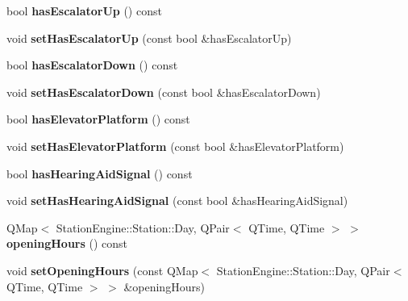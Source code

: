 \begin{DoxyCompactItemize}
bool {\bfseries has\+Escalator\+Up} () const
\item 
\mbox{\label{classStationEngine_1_1Station_abcd22776685752bf1f2a3cfa0f84bcc0}} 
void {\bfseries set\+Has\+Escalator\+Up} (const bool \&has\+Escalator\+Up)
\item 
\mbox{\label{classStationEngine_1_1Station_abc49d1258d3dd4b7b3915c37eec8ce8b}} 
bool {\bfseries has\+Escalator\+Down} () const
\item 
\mbox{\label{classStationEngine_1_1Station_a13d18cc2d7b1ceb4e855c686780f5fe4}} 
void {\bfseries set\+Has\+Escalator\+Down} (const bool \&has\+Escalator\+Down)
\item 
\mbox{\label{classStationEngine_1_1Station_ad942fab0cd4c1bd8bac2858b767cbd8d}} 
bool {\bfseries has\+Elevator\+Platform} () const
\item 
\mbox{\label{classStationEngine_1_1Station_a0b35cc4aa9f9ae7dc9503c7ea0919cb1}} 
void {\bfseries set\+Has\+Elevator\+Platform} (const bool \&has\+Elevator\+Platform)
\item 
\mbox{\label{classStationEngine_1_1Station_a971f2d09863474606867de1bffc5e0f8}} 
bool {\bfseries has\+Hearing\+Aid\+Signal} () const
\item 
\mbox{\label{classStationEngine_1_1Station_a6e03b24ad070910e8ac4dcdbbaa0c034}} 
void {\bfseries set\+Has\+Hearing\+Aid\+Signal} (const bool \&has\+Hearing\+Aid\+Signal)
\item 
\mbox{\label{classStationEngine_1_1Station_a952190a3454e31982d35cc3afd7d7d34}} 
Q\+Map$<$ Station\+Engine\+::\+Station\+::\+Day, Q\+Pair$<$ Q\+Time, Q\+Time $>$ $>$ {\bfseries opening\+Hours} () const
\item 
\mbox{\label{classStationEngine_1_1Station_a77c5ed806a41ad53afa4c03f96525bad}} 
void {\bfseries set\+Opening\+Hours} (const Q\+Map$<$ Station\+Engine\+::\+Station\+::\+Day, Q\+Pair$<$ Q\+Time, Q\+Time $>$ $>$ \&opening\+Hours)

\end{DoxyCompactItemize}
